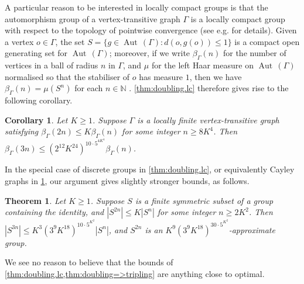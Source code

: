 \documentclass[10pt]{article}
\newcommand{\N}{\mathbb{N}}
\newcommand{\Aut}{\operatorname{Aut}\,}
\newtheorem{theorem}[theorem]{Theorem}
\newtheorem{corollary}[corollary]{Corollary}
\begin{document}
A particular reason to be interested in locally compact groups is that the automorphism group of a vertex-transitive graph $\Gamma$ is a locally compact group with respect to the topology of pointwise convergence (see e.g. \cite[\S4]{ttTrof} for details). Given a vertex $o\in\Gamma$, the set $S=\{g\in\Aut(\Gamma):d(o,g(o))\le1\}$ is a compact open generating set for $\Aut(\Gamma)$; moreover, if we write $\beta_\Gamma(n)$ for the number of vertices in a ball of radius $n$ in $\Gamma$, and $\mu$ for the left Haar measure on $\Aut(\Gamma)$ normalised so that the stabiliser of $o$ has measure $1$, then we have $\beta_\Gamma(n)=\mu(S^n)$ for each $n\in\N$ \cite[Lemma 4.8]{ttTrof}. \cref{thm:doubling.lc} therefore gives rise to the following corollary.
\begin{corollary}\label{cor:trans}
Let $K\ge1$. Suppose $\Gamma$ is a locally finite vertex-transitive graph satisfying $\beta_\Gamma(2n)\le K\beta_\Gamma(n)$ for some integer $n\ge8K^4$. Then $\beta_\Gamma(3n)\le(2^{12}K^{24})^{10\cdot5^{4K^4}}\beta_\Gamma(n)$.
\end{corollary}
In the special case of discrete groups in \cref{thm:doubling.lc}, or equivalently Cayley graphs in \cref{cor:trans}, our argument gives slightly stronger bounds, as follows.
\begin{theorem}\label{thm:doubling=>tripling}
Let $K\ge1$. Suppose $S$ is a finite symmetric subset of a group containing the identity, and $|S^{2n}|\le K|S^n|$ for some integer $n\ge2K^2$. Then $|S^{3n}|\le K^3(3^9K^{18})^{10\cdot5^{K^2}}|S^n|$, and $S^{2n}$ is an $K^9(3^9K^{18})^{30\cdot5^{K^2}}$-approximate group.
\end{theorem}
We see no reason to believe that the bounds of \cref{thm:doubling.lc,thm:doubling=>tripling} are anything close to optimal.
\end{document}
